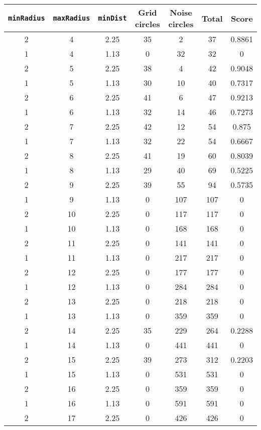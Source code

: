 \documentclass[letterpaper, 12pt]{article}
\begin{document}
\begin{longtable}{|c|c|c|c|c|c|c|}
\hline
\textbf{\texttt{minRadius}} & \textbf{\texttt{maxRadius}} & \textbf{\texttt{minDist}} & \textbf{Grid circles} & \textbf{Noise circles} & \textbf{Total} & \textbf{Score} \\
\hline
2 & 4 & 2.25 & 35 & 2 & 37 & 0.8861 \\
\hline
1 & 4 & 1.13 & 0 & 32 & 32 & 0 \\
\hline
2 & 5 & 2.25 & 38 & 4 & 42 & 0.9048 \\
\hline
1 & 5 & 1.13 & 30 & 10 & 40 & 0.7317 \\
\hline
2 & 6 & 2.25 & 41 & 6 & 47 & 0.9213 \\
\hline
1 & 6 & 1.13 & 32 & 14 & 46 & 0.7273 \\
\hline
2 & 7 & 2.25 & 42 & 12 & 54 & 0.875 \\
\hline
1 & 7 & 1.13 & 32 & 22 & 54 & 0.6667 \\
\hline
2 & 8 & 2.25 & 41 & 19 & 60 & 0.8039 \\
\hline
1 & 8 & 1.13 & 29 & 40 & 69 & 0.5225 \\
\hline
2 & 9 & 2.25 & 39 & 55 & 94 & 0.5735 \\
\hline
1 & 9 & 1.13 & 0 & 107 & 107 & 0 \\
\hline
2 & 10 & 2.25 & 0 & 117 & 117 & 0 \\
\hline
1 & 10 & 1.13 & 0 & 168 & 168 & 0 \\
\hline
2 & 11 & 2.25 & 0 & 141 & 141 & 0 \\
\hline
1 & 11 & 1.13 & 0 & 217 & 217 & 0 \\
\hline
2 & 12 & 2.25 & 0 & 177 & 177 & 0 \\
\hline
1 & 12 & 1.13 & 0 & 284 & 284 & 0 \\
\hline
2 & 13 & 2.25 & 0 & 218 & 218 & 0 \\
\hline
1 & 13 & 1.13 & 0 & 359 & 359 & 0 \\
\hline
2 & 14 & 2.25 & 35 & 229 & 264 & 0.2288 \\
\hline
1 & 14 & 1.13 & 0 & 441 & 441 & 0 \\
\hline
2 & 15 & 2.25 & 39 & 273 & 312 & 0.2203 \\
\hline
1 & 15 & 1.13 & 0 & 531 & 531 & 0 \\
\hline
2 & 16 & 2.25 & 0 & 359 & 359 & 0 \\
\hline
1 & 16 & 1.13 & 0 & 591 & 591 & 0 \\
\hline
2 & 17 & 2.25 & 0 & 426 & 426 & 0 \\
\hline

\end{longtable}
\end{document}
